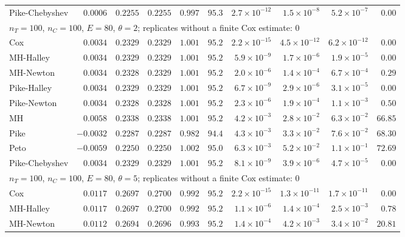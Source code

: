 \begin{landscape}
\begin{longtable}{lrrrrrrrrr}
Pike-Chebyshev & $0.0006$ & $0.2255$ & $0.2255$ & $0.997$ & $95.3$ & $2.7 \times 10^{-12}$ & $1.5 \times 10^{-8}$ & $5.2 \times 10^{-7}$ & $0.00$ \\
\multicolumn{10}{l}{$n_T = 100$, $n_C = 100$, $E = 80$, $\theta = 2$; replicates without a finite Cox estimate: 0} \\
Cox & $0.0034$ & $0.2329$ & $0.2329$ & $1.001$ & $95.2$ & $2.2 \times 10^{-15}$ & $4.5 \times 10^{-12}$ & $6.2 \times 10^{-12}$ & $0.00$ \\
MH-Halley & $0.0034$ & $0.2329$ & $0.2329$ & $1.001$ & $95.2$ & $5.9 \times 10^{-9}$ & $1.7 \times 10^{-6}$ & $1.9 \times 10^{-5}$ & $0.00$ \\
MH-Newton & $0.0034$ & $0.2328$ & $0.2329$ & $1.001$ & $95.2$ & $2.0 \times 10^{-6}$ & $1.4 \times 10^{-4}$ & $6.7 \times 10^{-4}$ & $0.29$ \\
Pike-Halley & $0.0034$ & $0.2329$ & $0.2329$ & $1.001$ & $95.2$ & $6.7 \times 10^{-9}$ & $2.9 \times 10^{-6}$ & $3.1 \times 10^{-5}$ & $0.00$ \\
Pike-Newton & $0.0034$ & $0.2328$ & $0.2328$ & $1.001$ & $95.2$ & $2.3 \times 10^{-6}$ & $1.9 \times 10^{-4}$ & $1.1 \times 10^{-3}$ & $0.50$ \\
MH & $0.0058$ & $0.2338$ & $0.2338$ & $1.001$ & $95.2$ & $4.2 \times 10^{-3}$ & $2.8 \times 10^{-2}$ & $6.3 \times 10^{-2}$ & $66.85$ \\
Pike & $-0.0032$ & $0.2287$ & $0.2287$ & $0.982$ & $94.4$ & $4.3 \times 10^{-3}$ & $3.3 \times 10^{-2}$ & $7.6 \times 10^{-2}$ & $68.30$ \\
Peto & $-0.0059$ & $0.2250$ & $0.2250$ & $1.002$ & $95.0$ & $6.3 \times 10^{-3}$ & $5.2 \times 10^{-2}$ & $1.1 \times 10^{-1}$ & $72.69$ \\
Pike-Chebyshev & $0.0034$ & $0.2329$ & $0.2329$ & $1.001$ & $95.2$ & $8.1 \times 10^{-9}$ & $3.9 \times 10^{-6}$ & $4.7 \times 10^{-5}$ & $0.00$ \\
\multicolumn{10}{l}{$n_T = 100$, $n_C = 100$, $E = 80$, $\theta = 5$; replicates without a finite Cox estimate: 0} \\
Cox & $0.0117$ & $0.2697$ & $0.2700$ & $0.992$ & $95.2$ & $2.2 \times 10^{-15}$ & $1.3 \times 10^{-11}$ & $1.7 \times 10^{-11}$ & $0.00$ \\
MH-Halley & $0.0117$ & $0.2697$ & $0.2700$ & $0.992$ & $95.2$ & $1.1 \times 10^{-6}$ & $1.4 \times 10^{-4}$ & $2.5 \times 10^{-3}$ & $0.78$ \\
MH-Newton & $0.0112$ & $0.2694$ & $0.2696$ & $0.993$ & $95.2$ & $1.4 \times 10^{-4}$ & $4.2 \times 10^{-3}$ & $3.4 \times 10^{-2}$ & $20.81$ \\

\end{longtable}
\end{landscape}
